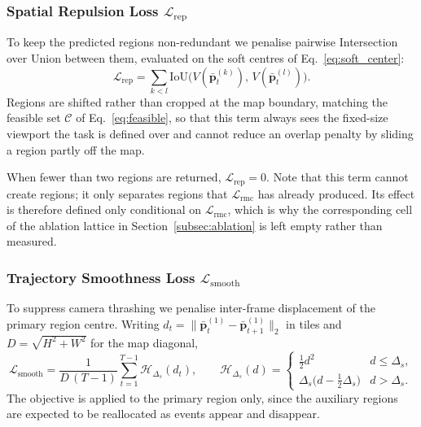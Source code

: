 \documentclass[preprint,12pt]{elsarticle}
\begin{document}
\subsubsection{Spatial Repulsion Loss $\mathcal{L}_{\text{rep}}$}

To keep the predicted regions non-redundant we penalise pairwise Intersection
over Union between them, evaluated on the soft centres of
Eq.~\ref{eq:soft_center}:
\begin{equation}
  \mathcal{L}_{\text{rep}} = \sum_{k < l}
    \text{IoU}\!\bigl(V(\bar{\mathbf{p}}^{(k)}_t),\,
                      V(\bar{\mathbf{p}}^{(l)}_t)\bigr).
  \label{eq:rep_loss}
\end{equation}
Regions are shifted rather than cropped at the map boundary, matching the
feasible set $\mathcal{C}$ of Eq.~\ref{eq:feasible}, so that this term always
sees the fixed-size viewport the task is defined over and cannot reduce an
overlap penalty by sliding a region partly off the map.

When fewer than two regions are returned, $\mathcal{L}_{\text{rep}} = 0$. Note
that this term cannot create regions; it only separates regions that
$\mathcal{L}_{\text{rmc}}$ has already produced. Its effect is therefore
defined only conditional on $\mathcal{L}_{\text{rmc}}$, which is why the
corresponding cell of the ablation lattice in Section~\ref{subsec:ablation} is
left empty rather than measured.

\subsubsection{Trajectory Smoothness Loss $\mathcal{L}_{\text{smooth}}$}

To suppress camera thrashing we penalise inter-frame displacement of the
primary region centre. Writing $d_t = \|\bar{\mathbf{p}}^{(1)}_t -
\bar{\mathbf{p}}^{(1)}_{t+1}\|_2$ in tiles and $D = \sqrt{H^2+W^2}$ for the
map diagonal,
\begin{equation}
  \mathcal{L}_{\text{smooth}} = \frac{1}{D\,(T-1)}\sum_{t=1}^{T-1}
    \mathcal{H}_{\Delta_s}(d_t), \qquad
  \mathcal{H}_{\Delta_s}(d) = \begin{cases}
    \tfrac{1}{2}d^2 & d \le \Delta_s, \\[2pt]
    \Delta_s\bigl(d - \tfrac{1}{2}\Delta_s\bigr) & d > \Delta_s.
  \end{cases}
  \label{eq:smooth_loss}
\end{equation}
The objective is applied to the primary region only, since the auxiliary
regions are expected to be reallocated as events appear and disappear.
\end{document}

